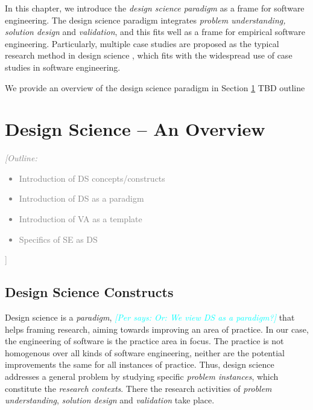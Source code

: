 \documentclass[graybox]{svmult}
\newcommand{\emelie}[1]{\textcolor{red}{{\it [Emelie says: #1]}}}
\newcommand{\per}[1]{\textcolor{cyan}{{\it [Per says: #1]}}}
\newcommand{\outline}[1]{\textcolor{gray}{{\it [Outline: #1]}}}
\newcommand{\emelie}[1]{}
\newcommand{\per}[1]{}
\newcommand{\outline}[1]{}
\begin{document}
In this chapter, we introduce the \emph{design science paradigm} as a frame for software engineering. The design science paradigm integrates \emph{problem understanding, solution design} and \emph{validation}, and this fits well as a frame for empirical software engineering. Particularly, multiple case studies are proposed as the typical research method in design science \cite{van_aken_management_2004}, which fits with the widespread use of case studies in software engineering.

We provide an overview of the design science paradigm in Section \ref{sec:overview} TBD outline

\section{Design Science -- An Overview}
\label{sec:overview}
\outline{\begin{itemize}
\item Introduction of DS concepts/constructs
\item Introduction of DS as a paradigm
\item Introduction of VA as a template
\item Specifics of SE as DS
\end{itemize}}

\subsection{Design Science Constructs}

Design science is a \emph{paradigm}, \per{Or: We view DS as a paradigm?} that helps framing research, aiming towards improving an area of practice. In our case, the engineering of software is the practice area in focus. The practice is not homogenous over all kinds of software engineering, neither are the potential improvements the same for all instances of practice. Thus, design science addresses a general problem by studying  specific \emph{problem instances}, which constitute the \emph{research contexts}.  There the research activities of \emph{problem understanding}, \emph{solution design} and \emph{validation} take place. %
\end{document}
